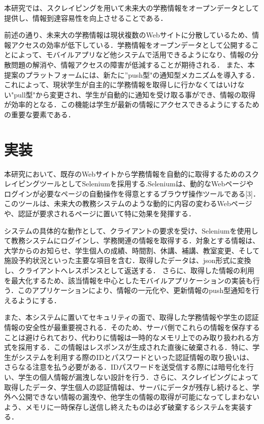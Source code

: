 \documentclass[11pt]{ujarticle}
\begin{document}
本研究では、スクレイピングを用いて未来大の学務情報をオープンデータとして提供し、情報到達容易性を向上させることである．

前述の通り、未来大の学務情報は現状複数のWebサイトに分散しているため、情報アクセスの効率が低下している．学務情報をオープンデータとして公開することによって、モバイルアプリなど他システムで活用できるようになり、情報の分散問題の解消や、情報アクセスの障害が低減することが期待される．
また、本提案のプラットフォームには、新たに”push型"の通知型メカニズムを導入する．これによって、現状学生が自主的に学務情報を取得しに行かなくてはいけない"pull型"から変更され、学生が自動的に通知を受け取る事ができ、情報の取得が効率的となる．この機能は学生が最新の情報にアクセスできるようにするための重要な要素である．


\section{実装}

本研究において、既存のWebサイトから学務情報を自動的に取得するためのスクレイピングツールとしてSeleniumを採用する.Seleniumは、動的なWebページやログインが必要なページの自動操作を得意とするブラウザ操作ツールである[3]．このツールは、未来大の教務システムのような動的に内容の変わるWebページや、認証が要求されるページに置いて特に効果を発揮する．

システムの具体的な動作として、クライアントの要求を受け、Seleniumを使用して教務システムにログインし、学務関連の情報を取得する．対象とする情報は、大学からのお知らせ、学生個人の成績、時間割、休講、補講、教室変更、そして施設予約状況といった主要な項目を含む．取得したデータは、json形式に変換し、クライアントへレスポンスとして返送する．
さらに、取得した情報の利用を最大化するため、該当情報を中心としたモバイルアプリケーションの実装も行う．このアプリケーションにより、情報の一元化や、更新情報のpush型通知を行えるようにする．



また、本システムに置いてセキュリティの面で、取得した学務情報や学生の認証情報の安全性が最重要視される．そのため、サーバ側でこれらの情報を保存することは避けられており、代わりに情報は一時的なメモリ上でのみ取り扱われる方式を採用する．この情報はレスポンスが生成された直後に破棄される．特に、学生がシステムを利用する際のIDとパスワードといった認証情報の取り扱いは、さらなる注意を払う必要がある．IDパスワードを送受信する際には暗号化を行い、学生の個人情報が漏洩しない設計を行う．さらに、スクレイピングによって取得したデータ、学生個人の認証情報は、サーバにデータが残存し続けると、学外へ公開できない情報の漏洩や、他学生の情報の取得が可能になってしまわないよう、メモリに一時保存し送信し終えたものは必ず破棄するシステムを実装する．
\end{document}

